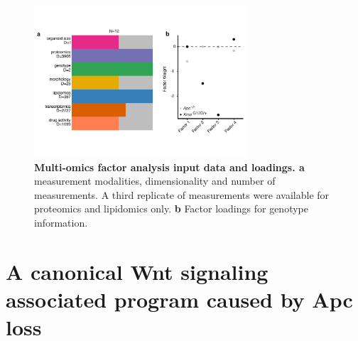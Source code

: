 \begin{flushleft}
\begin{figure}[h!]
\centering
\includegraphics[width=300,
                height=\textheight,
                keepaspectratio]{figures/adenomaprofiling/pdf/fig_1_8.pdf}
\caption{\textbf{Multi-omics factor analysis input data and loadings. a} measurement modalities, dimensionality and number of measurements. A third replicate of measurements were available for proteomics and lipidomics only. \textbf{b} Factor loadings for genotype information.} 
\label{fig_180}
\end{figure}
\bigbreak

\section{A canonical Wnt signaling associated program caused by Apc loss}


\end{flushleft}
